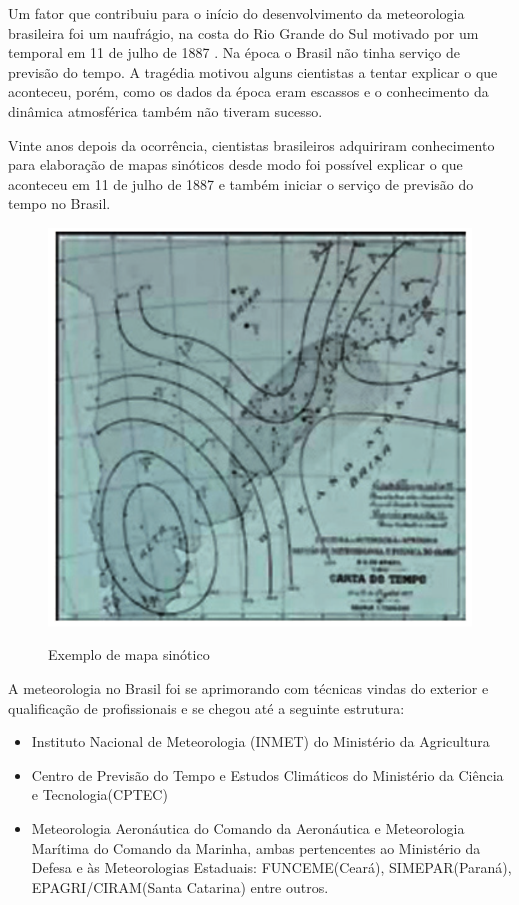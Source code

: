 Um fator que contribuiu para o início do desenvolvimento da meteorologia brasileira foi um naufrágio, na costa do Rio Grande do Sul motivado por um temporal em 11 de julho de 1887 \cite{barboza2006historia}. Na época o Brasil não tinha serviço de previsão do tempo. A tragédia motivou alguns cientistas a tentar explicar o que aconteceu, porém, como os dados da época eram escassos e o conhecimento da dinâmica atmosférica também não tiveram sucesso.

Vinte anos depois da ocorrência, cientistas brasileiros adquiriram conhecimento para elaboração de mapas sinóticos desde modo foi possível explicar o que aconteceu em 11 de julho de 1887 e também iniciar o serviço de previsão do tempo no Brasil\cite{oliveira2009inmet}.

\begin{figure} [!ht]
    \centering
    \caption{Exemplo de mapa sinótico}
    \includegraphics [scale = 0.35] {Figuras/mapa_sinotico.png}
    \label{fig:4}
\end{figure}

A meteorologia no Brasil foi se aprimorando com técnicas vindas do exterior e qualificação de profissionais e se chegou até a seguinte estrutura:

\begin{itemize}
    \item Instituto Nacional de Meteorologia (INMET) do Ministério da Agricultura
    \item Centro de Previsão do Tempo e Estudos Climáticos do Ministério da Ciência e Tecnologia(CPTEC)
    \item Meteorologia Aeronáutica do Comando da Aeronáutica e Meteorologia Marítima do Comando da Marinha, ambas pertencentes ao Ministério da Defesa e às Meteorologias Estaduais: FUNCEME(Ceará), SIMEPAR(Paraná), EPAGRI/CIRAM(Santa Catarina) entre outros.
\end{itemize}

